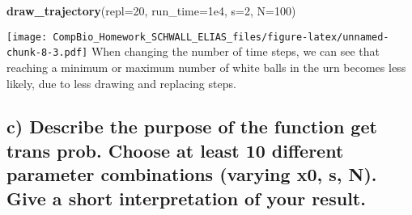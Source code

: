 \documentclass[
]{article}
\newenvironment{Shaded}{\begin{snugshade}}{\end{snugshade}}
\newcommand{\AttributeTok}[1]{\textcolor[rgb]{0.13,0.29,0.53}{#1}}
\newcommand{\DecValTok}[1]{\textcolor[rgb]{0.00,0.00,0.81}{#1}}
\newcommand{\FloatTok}[1]{\textcolor[rgb]{0.00,0.00,0.81}{#1}}
\newcommand{\FunctionTok}[1]{\textcolor[rgb]{0.13,0.29,0.53}{\textbf{#1}}}
\newcommand{\NormalTok}[1]{#1}
\begin{document}
\begin{Shaded}
\begin{Highlighting}[]
\FunctionTok{draw\_trajectory}\NormalTok{(}\AttributeTok{repl=}\DecValTok{20}\NormalTok{, }\AttributeTok{run\_time=}\FloatTok{1e4}\NormalTok{, }\AttributeTok{s=}\DecValTok{2}\NormalTok{, }\AttributeTok{N=}\DecValTok{100}\NormalTok{)}
\end{Highlighting}
\end{Shaded}

\texttt{[image: CompBio\_Homework\_SCHWALL\_ELIAS\_files/figure-latex/unnamed-chunk-8-3.pdf]}
When changing the number of time steps, we can see that reaching a
minimum or maximum number of white balls in the urn becomes less likely,
due to less drawing and replacing steps.

\hypertarget{c-describe-the-purpose-of-the-function-get-trans-prob.-choose-at-least-10-different-parameter-combinations-varying-x0-s-n.-give-a-short-interpretation-of-your-result.}{%
\subsection{c) Describe the purpose of the function get trans prob.
Choose at least 10 different parameter combinations (varying x0, s, N).
Give a short interpretation of your
result.}\label{c-describe-the-purpose-of-the-function-get-trans-prob.-choose-at-least-10-different-parameter-combinations-varying-x0-s-n.-give-a-short-interpretation-of-your-result.}}
\end{document}
